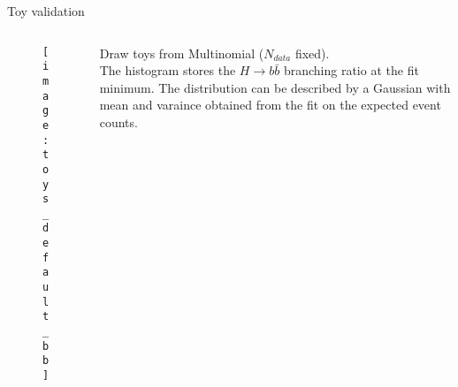 \begin{block}{Toy validation}
\begin{columns}
\begin{column}{.33\textwidth}
    \begin{figure}
        \centering\texttt{[image: toys\_default\_bb]}
    \end{figure}
\end{column}
\begin{column}{.67\textwidth}
    Draw toys from Multinomial ($N_{data}$ fixed). \\
    The histogram stores the $H\to b\bar{b}$ branching ratio at the fit minimum.
    The distribution can be described by a Gaussian with
    mean and varaince obtained from the fit on the expected event counts.
\end{column}
\end{columns}
\end{block}
